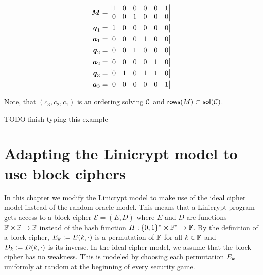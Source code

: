 
\begin{align*}
\boldsymbol{M}    &= \begin{vmatrix}
            1 & 0 & 0 & 0 & 0 & 1 \\
            0 & 0 & 1 & 0 & 0 & 0 
            \end{vmatrix} \\
\boldsymbol q_1 &= \begin{vmatrix}1 & 0 & 0 & 0 & 0 & 0\end{vmatrix} \\
\boldsymbol a_1 &= \begin{vmatrix}0 & 0 & 0 & 1 & 0 & 0\end{vmatrix} \\
\boldsymbol q_2 &= \begin{vmatrix}0 & 0 & 1 & 0 & 0 & 0\end{vmatrix} \\
\boldsymbol a_2 &= \begin{vmatrix}0 & 0 & 0 & 0 & 1 & 0\end{vmatrix} \\
\boldsymbol q_3 &= \begin{vmatrix}0 & 1 & 0 & 1 & 1 & 0\end{vmatrix} \\
\boldsymbol a_3 &= \begin{vmatrix}0 & 0 & 0 & 0 & 0 & 1\end{vmatrix} \\
\end{align*}

Note, that $(c_3, c_2, c_1)$ is an ordering solving $\mathcal{C}$ and $\mathsf{rows}(M) \subset \mathsf{sol}(\mathcal{C})$.

TODO finish typing this example

\section{Adapting the Linicrypt model to use block ciphers}

In this chapter we modify the Linicrypt model to make use of the ideal cipher model instead of the random oracle model.
This means that a Linicrypt program gets access to a block cipher $\mathcal{E} = (E, D)$ where $E$ and $D$ are functions $\mathbb{F} \times \mathbb{F} \to \mathbb{F}$
instead of the hash function $H : \{0,1\}^* \times \mathbb{F}^* \to \mathbb{F}$.
By the definition of a block cipher,
$E_k := E(k, \cdot)$ is a permutation of $\mathbb{F}$ for all $k \in \mathbb{F}$ and
$D_k := D(k, \cdot)$ is its inverse.
In the ideal cipher model, we assume that the block cipher has no weakness.
This is modeled by choosing each permutation $E_k$ uniformly at random at the beginning of every security game.


